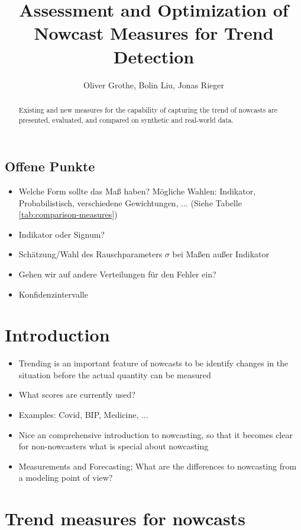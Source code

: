 \documentclass[oneside]{article}
\title{Assessment and Optimization of Nowcast Measures for Trend Detection}
\author{Oliver Grothe, Bolin Liu, Jonas Rieger}
\theoremstyle{plain}%
\theoremstyle{definition}
\begin{document}
\maketitle

\begin{abstract}
Existing and new measures for the capability of capturing the trend of nowcasts are presented, evaluated, and compared on synthetic and real-world data.
\end{abstract}

\subsection*{Offene Punkte}

\begin{itemize}
    \item Welche Form sollte das Maß haben? Mögliche Wahlen: Indikator, Probabilistisch, verschiedene Gewichtungen, ... (Siehe Tabelle \ref{tab:comparison-measures})
    \item Indikator oder Signum?
    \item Schätzung/Wahl des Rauschparameters $\sigma$ bei Maßen außer Indikator
    \item Gehen wir auf andere Verteilungen für den Fehler ein?
    \item Konfidenzintervalle
\end{itemize}

\listoftodos


\section{Introduction}

\begin{itemize}
	\item Trending is an important feature of nowcasts to be identify changes in the situation before the actual quantity can be measured
	\item What scores are currently used?
	\item Examples: Covid, BIP, Medicine, ... 
 \item Nice an comprehensive introduction to nowcasting, so that it becomes clear for non-nowcasters what is special about nowcasting
 \item Measurements and Forecasting; What are the differences to nowcasting from a modeling point of view?
\end{itemize}


\section{Trend measures for nowcasts}
\end{document}
